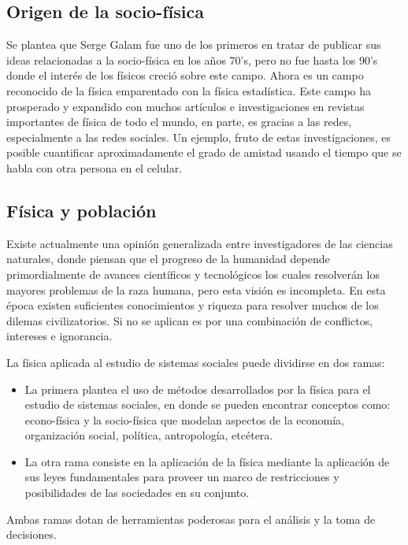 \subsection*{Origen de la socio-física}
Se plantea que Serge Galam fue uno de los primeros en tratar de publicar sus ideas relacionadas a la socio-física en los años 70's, pero no fue hasta los 90's donde el interés de los físicos creció sobre este campo. Ahora es un campo reconocido de la física emparentado con la física estadística. Este campo ha prosperado y expandido con muchos artículos e investigaciones en revistas importantes de física de todo el mundo, en parte, es gracias a las redes, especialmente a las redes sociales.\cite{Galam.1986} Un ejemplo, fruto de estas investigaciones, es posible cuantificar aproximadamente el grado de amistad usando el tiempo que se habla con otra persona en el celular.\cite{OctavioMiramontes2013}

\subsection*{Física y población}
Existe actualmente una opinión generalizada entre investigadores de las ciencias naturales, donde piensan que el progreso de la humanidad depende primordialmente de avances científicos y tecnológicos los cuales resolverán los mayores problemas de la raza humana, pero esta visión es incompleta. En esta época existen suficientes conocimientos y riqueza para resolver muchos de los dilemas civilizatorios. Si no se aplican es por una combinación de conflictos, intereses e ignorancia. \cite{OctavioMiramontes2013}


La física aplicada al estudio de sistemas sociales puede dividirse en dos ramas: 
\begin{itemize}
    \item La primera plantea el uso de métodos desarrollados por la física para el estudio de sistemas sociales, en donde se pueden encontrar conceptos como: econo-física y la socio-física que modelan aspectos de la economía, organización social, política, antropología, etcétera.
    \item La otra rama consiste en la aplicación de la física mediante la aplicación de sus leyes fundamentales para proveer un marco de restricciones y posibilidades de las sociedades en su conjunto.
\end{itemize}
Ambas ramas dotan de herramientas poderosas para el análisis y la toma de decisiones. \cite{OctavioMiramontes2013}

